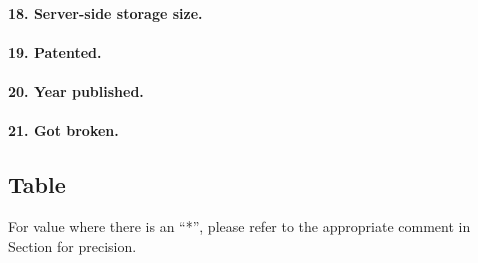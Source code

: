 \documentclass[../report.tex]{subfiles}
\begin{document}
\paragraph{18. Server-side storage size.}


\paragraph{19. Patented.}


\paragraph{20. Year published.}


\paragraph{21. Got broken.}




\subsection{Table}

For value where there is an ``*'', please refer to the appropriate comment in Section \cite{sec:comparison_details} for precision.
\end{document}
